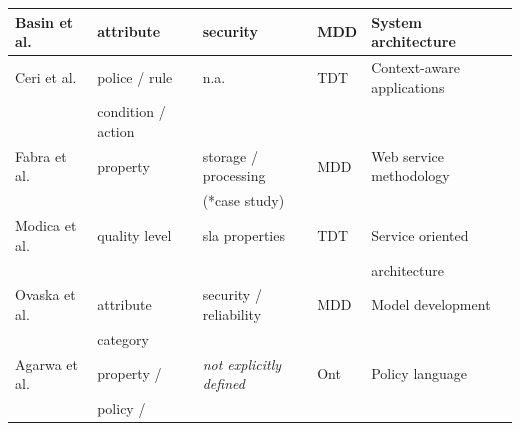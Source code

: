 \documentclass{sig-alternate}
\begin{document}
\begin{table}[ht!]
\begin{tabular}{l|l|l|l|l}
  \hline
  Basin et al. \cite{BasinDL06} &  attribute & security  & MDD & System
  architecture
  \\
  \hline
  Ceri et al. \cite{CeriDMF07} & police / rule  & n.a. & TDT & Context-aware
  applications
   \\
  &  condition / action &    &  &
  
  \\
  \hline
  Fabra et al. \cite{Fabra2011} & property & storage /
  processing & MDD & Web service methodology 
  \\
   &   & (*case study) &  & 
  \\
  \hline
  Modica et al. \cite{ModicaTV09} & quality level & sla
  properties & TDT &  Service oriented 
  \\
   &  &  &  & architecture \\
  \hline
  Ovaska et al. \cite{OvaskaEHPA10} & attribute & security / reliability
  & MDD &  Model development
  \\
   
  &  category &    &  &
  \\
  \hline
  Agarwa et al. \cite{AgarwalLS09} & property / & \textit{not explicitly
  defined} & Ont & Policy language
  \\
   
  &  policy / &    &  &
  \\
  

\end{tabular}
\end{table}
\end{document}
